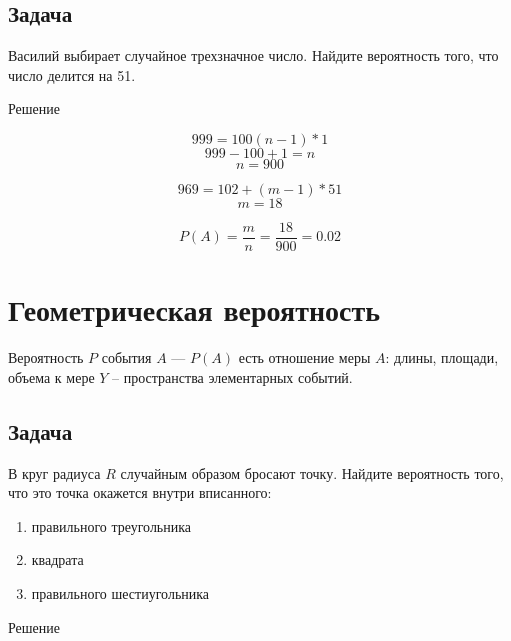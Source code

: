 \documentclass[a4paper,12pt]{article}
\begin{document}
\subsection{Задача}
Василий выбирает случайное трехзначное число. Найдите вероятность того, что число делится на 51.
\begin{center}
Решение
\end{center}
$$999=100(n-1)*1$$
$$999-100+1=n$$
$$n=900$$

$$969=102+(m-1)*51$$
$$m=18$$

$$P(A)=\frac{m}{n}=\frac{18}{900}=0.02$$

\section*{Геометрическая вероятность}
Вероятность $P$ события $A$ --- $P(A)$ есть отношение меры $A$: длины, площади, объема к мере $Y$ -- пространства элементарных событий.

\subsection{Задача}
В круг радиуса $R$ случайным образом бросают точку. Найдите вероятность того, что это точка окажется внутри вписанного:
\begin{enumerate}
	\item правильного треугольника
	\item квадрата
	\item правильного шестиугольника
\end{enumerate}
\begin{center}
Решение
\end{center}
\end{document}
